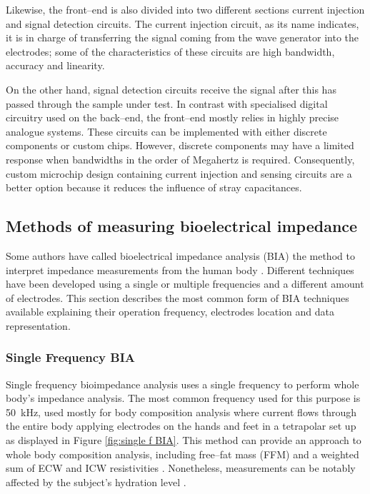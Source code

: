 Likewise, the front–end is also divided into two different sections current injection and signal detection circuits. The current injection circuit, as its name indicates, it is in charge of transferring the signal coming from the wave generator into the electrodes; some of the characteristics of these circuits are high bandwidth, accuracy and linearity. 

On the other hand, signal detection circuits receive the signal after this has passed through the sample under test. In contrast with specialised digital circuitry used on the back–end, the front–end mostly relies in highly precise analogue systems. These circuits can be implemented with either discrete components or custom chips. However, discrete components may have a limited response when bandwidths in the order of Megahertz is required. Consequently, custom microchip design containing current injection and sensing circuits are a better option because it reduces the influence of stray capacitances. 

\subsection{Methods of measuring bioelectrical impedance}
\label{section impedance 6.1}
Some authors have called bioelectrical impedance analysis (BIA) the method to interpret impedance measurements from the human body \cite{kyle2004bioelectrical}. Different techniques have been developed using a single or multiple frequencies and a different amount of electrodes. This section describes the most common form of BIA techniques available explaining their operation frequency, electrodes location and data representation.

\subsubsection{Single Frequency BIA}
Single frequency bioimpedance analysis uses a single frequency to perform whole body’s impedance analysis. The most common frequency used for this purpose is \SI{50}{\kilo\hertz}, used mostly for body composition analysis where current flows through the entire body applying electrodes on the hands and feet in a tetrapolar set up as displayed in Figure \ref{fig:single f BIA}. This method can provide an approach to whole body composition analysis, including free–fat mass (FFM) and a weighted sum of ECW and ICW resistivities \cite{kyle2004bioelectrical}. Nonetheless, measurements can be notably affected by the subject’s hydration level \cite{gudivaka1999single,schoeller2000bioelectrical}.


